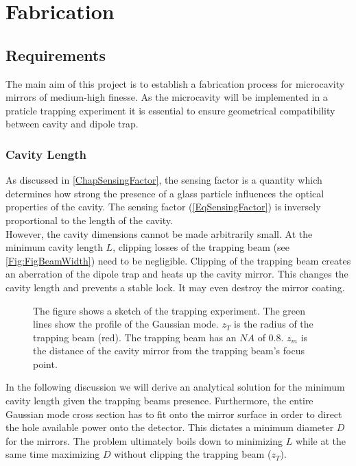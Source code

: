\chapter{Fabrication}
\section{Requirements}
The main aim of this project is to establish a fabrication process for microcavity mirrors of medium-high finesse. As the microcavity will be implemented in a praticle trapping experiment it is essential to ensure geometrical compatibility between cavity and dipole trap.

\subsection{Cavity Length}\label{ChapCavityLength}
As discussed in \autoref{ChapSensingFactor}, the sensing factor is a quantity which determines how strong the presence of a glass particle influences the optical properties of the cavity. The sensing factor (\autoref{EqSensingFactor}) is inversely proportional to the length of the cavity.\\
However, the cavity dimensions cannot be made arbitrarily small. At the minimum cavity length $L$, clipping losses of the trapping beam (see \autoref{Fig:FigBeamWidth}) need to be negligible. Clipping of the trapping beam creates an aberration of the dipole trap and heats up the cavity mirror. This changes the cavity length and prevents a stable lock. It may even destroy the mirror coating.\\
\begin{figure}[H]
	
	\caption{The figure shows a sketch of the trapping experiment. The green lines show the profile of the Gaussian mode. $z_{\si{T}}$ is the radius of the trapping beam (red). The trapping beam has an $\si{NA}$ of $0.8$. $z_{\si{m}}$ is the distance of the cavity mirror from the trapping beam's focus point.}
	\label{Fig:FigBeamWidth}
\end{figure}
In the following discussion we will derive an analytical solution for the minimum cavity length given the trapping beams presence. Furthermore, the entire Gaussian mode cross section has to fit onto the mirror surface in order to direct the hole available power onto the detector. This dictates a minimum diameter $D$ for the mirrors. The problem ultimately boils down to minimizing $L$ while at the same time maximizing $D$ without clipping the trapping beam ($z_{\si{T}}$).\\
